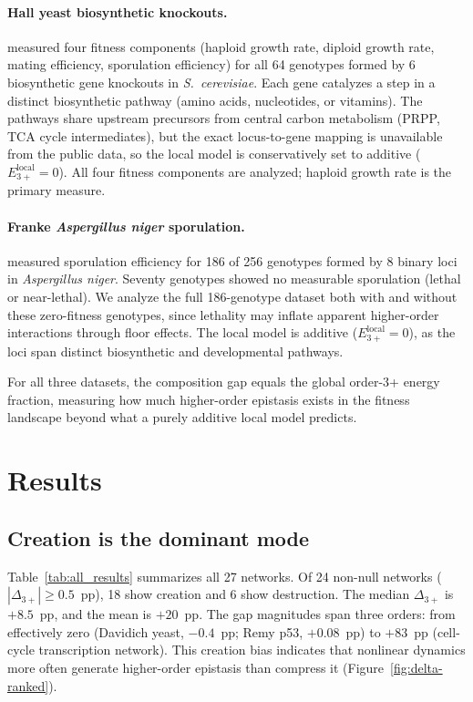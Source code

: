 \documentclass[10pt]{article}
\begin{document}
\paragraph{Hall yeast biosynthetic knockouts.}
\citet{hall2010fitness} measured four fitness components (haploid
growth rate, diploid growth rate, mating efficiency, sporulation
efficiency) for all 64 genotypes formed by 6 biosynthetic gene
knockouts in \emph{S.~cerevisiae}. Each gene catalyzes a step in a
distinct biosynthetic pathway (amino acids, nucleotides, or
vitamins). The pathways share upstream precursors from central
carbon metabolism (PRPP, TCA cycle intermediates), but the exact
locus-to-gene mapping is unavailable from the public data, so the
local model is conservatively set to additive
($E_{3+}^{\mathrm{local}} = 0$). All four fitness components are
analyzed; haploid growth rate is the primary measure.

\paragraph{Franke \emph{Aspergillus niger} sporulation.}
\citet{franke2011evolutionary} measured sporulation efficiency for
186 of 256 genotypes formed by 8 binary loci in
\emph{Aspergillus niger}. Seventy genotypes showed no measurable
sporulation (lethal or near-lethal). We analyze the full 186-genotype
dataset both with and without these zero-fitness genotypes, since
lethality may inflate apparent higher-order interactions through
floor effects. The local model is additive
($E_{3+}^{\mathrm{local}} = 0$), as the loci span distinct
biosynthetic and developmental pathways.

For all three datasets, the composition gap equals the global order-3+
energy fraction, measuring how much higher-order epistasis exists
in the fitness landscape beyond what a purely additive local model
predicts.


\section{Results}
\label{sec:results}

\subsection{Creation is the dominant mode}

Table~\ref{tab:all_results} summarizes all 27 networks. Of 24
non-null networks ($|\Delta_{3+}| \geq 0.5$~pp), 18 show creation
and 6 show destruction. The median $\Delta_{3+}$ is $+8.5$~pp, and
the mean is $+20$~pp. The gap magnitudes span three orders: from
effectively zero (Davidich yeast, $-0.4$~pp; Remy p53, $+0.08$~pp)
to $+83$~pp (cell-cycle transcription network). This creation bias
indicates that nonlinear dynamics more often generate higher-order
epistasis than compress it (Figure~\ref{fig:delta-ranked}).
\end{document}
